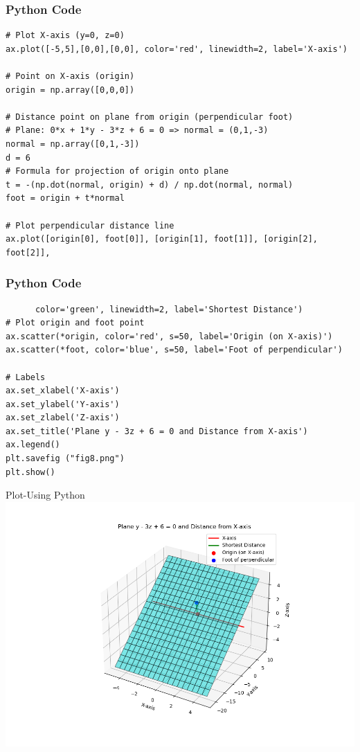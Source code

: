 \documentclass{beamer}
\begin{document}
\begin{frame}[fragile]
    \frametitle{Python Code}
    \begin{lstlisting}
# Plot X-axis (y=0, z=0)
ax.plot([-5,5],[0,0],[0,0], color='red', linewidth=2, label='X-axis')

# Point on X-axis (origin)
origin = np.array([0,0,0])

# Distance point on plane from origin (perpendicular foot)
# Plane: 0*x + 1*y - 3*z + 6 = 0 => normal = (0,1,-3)
normal = np.array([0,1,-3])
d = 6
# Formula for projection of origin onto plane
t = -(np.dot(normal, origin) + d) / np.dot(normal, normal)
foot = origin + t*normal

# Plot perpendicular distance line
ax.plot([origin[0], foot[0]], [origin[1], foot[1]], [origin[2], foot[2]],
\end{lstlisting}
\end{frame}


\begin{frame}[fragile]
    \frametitle{Python Code}
    \begin{lstlisting}
      color='green', linewidth=2, label='Shortest Distance')
# Plot origin and foot point
ax.scatter(*origin, color='red', s=50, label='Origin (on X-axis)')
ax.scatter(*foot, color='blue', s=50, label='Foot of perpendicular')

# Labels
ax.set_xlabel('X-axis')
ax.set_ylabel('Y-axis')
ax.set_zlabel('Z-axis')
ax.set_title('Plane y - 3z + 6 = 0 and Distance from X-axis')
ax.legend()
plt.savefig ("fig8.png") 
plt.show()
\end{lstlisting}
\end{frame}

\begin{frame}{Plot-Using Python}
    \centering
    \includegraphics[width=\columnwidth, height=0.8\textheight, keepaspectratio]{figs/fig8.png}     
\end{frame}
\end{document}
